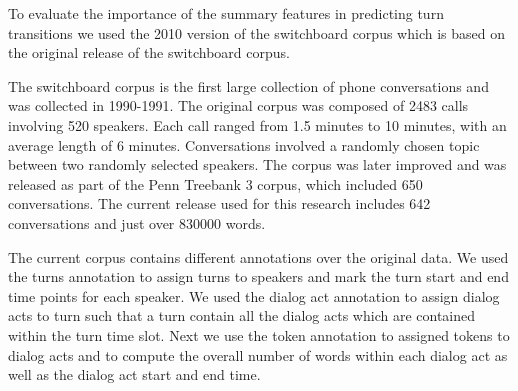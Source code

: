 To evaluate the importance of the summary features in predicting turn transitions we used the 2010 version of the switchboard corpus \cite{calhoun2010nxt} which is based on the original release \cite{225858} of the switchboard corpus.

The switchboard corpus is the first large collection of phone conversations and was collected in 1990-1991. The original corpus was composed of 2483 calls involving 520 speakers. Each call ranged from 1.5 minutes to 10 minutes, with an average length of 6 minutes. Conversations involved a randomly chosen topic between two randomly selected speakers. The corpus was later improved and was released as part of the Penn Treebank 3 corpus, which included 650 conversations. The current release used for this research includes 642 conversations and just over 830000 words.

The current corpus contains different annotations over the original data. We used the turns annotation to assign turns to speakers and mark the turn start and end time points for each speaker. We used the dialog act annotation to assign dialog acts to turn such that a turn contain all the dialog acts which are contained within the turn time slot. Next we use the token annotation to assigned tokens to dialog acts and to compute the overall number of words within each dialog act as well as the dialog act start and end time.
